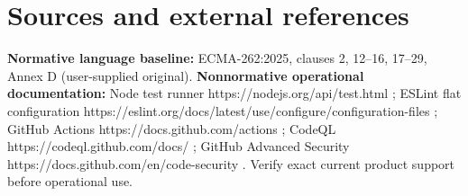 \documentclass[11pt,letterpaper]{article}
\begin{document}
\section{Sources and external references}\label{sources-and-external-references}

\textbf{Normative language baseline:} ECMA-262:2025, clauses 2, 12--16, 17--29, Annex D (user-supplied original). \textbf{Nonnormative operational documentation:} Node test runner https://nodejs.org/api/test.html ; ESLint flat configuration https://eslint.org/docs/latest/use/configure/configuration-files ; GitHub Actions https://docs.github.com/actions ; CodeQL https://codeql.github.com/docs/ ; GitHub Advanced Security https://docs.github.com/en/code-security . Verify exact current product support before operational use.
\end{document}
